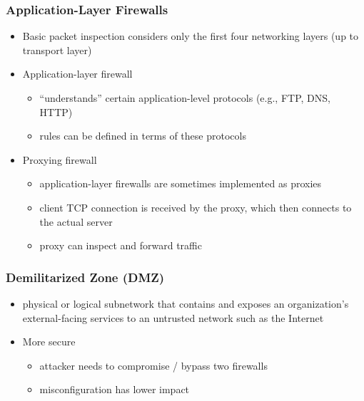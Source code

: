 \documentclass[final]{article}
\begin{document}
\subsubsection*{Application-Layer Firewalls}
\begin{itemize}[nosep]
    \item Basic packet inspection considers only the first four networking layers (up to transport layer)
    \item Application-layer firewall
          \begin{itemize}[nosep]
              \item ``understands'' certain application-level protocols (e.g., FTP, DNS, HTTP)
              \item rules can be defined in terms of these protocols
          \end{itemize}
    \item Proxying firewall
          \begin{itemize}[nosep]
              \item application-layer firewalls are sometimes implemented as proxies
              \item client TCP connection is received by the proxy, which then connects to the actual server
              \item proxy can inspect and forward traffic
          \end{itemize}
\end{itemize}
\subsubsection*{Demilitarized Zone (DMZ)}
\begin{itemize}[nosep]
    \item physical or logical subnetwork that contains and exposes an organization's external-facing services to an untrusted network such as the Internet
    \item More secure
          \begin{itemize}[nosep]
              \item attacker needs to compromise / bypass two firewalls
              \item misconfiguration has lower impact
          \end{itemize}
          \begin{figure}[H]
          \end{figure}
\end{itemize}
\end{document}

